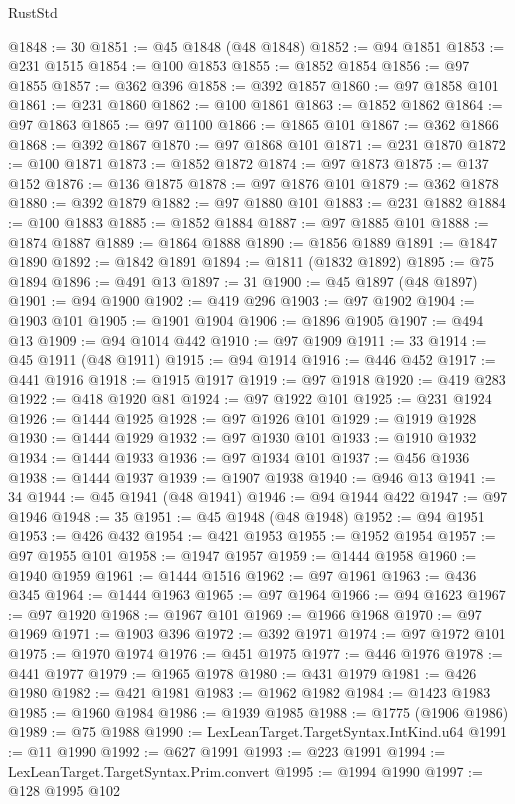 \begin{lexlean}{RustStd}
\begin{coremodule}
@1848 := 30
@1851 := @45 @1848 (@48 @1848)
@1852 := @94 @1851
@1853 := @231 @1515
@1854 := @100 @1853
@1855 := @1852 @1854
@1856 := @97 @1855
@1857 := @362 @396
@1858 := @392 @1857
@1860 := @97 @1858 @101
@1861 := @231 @1860
@1862 := @100 @1861
@1863 := @1852 @1862
@1864 := @97 @1863
@1865 := @97 @1100
@1866 := @1865 @101
@1867 := @362 @1866
@1868 := @392 @1867
@1870 := @97 @1868 @101
@1871 := @231 @1870
@1872 := @100 @1871
@1873 := @1852 @1872
@1874 := @97 @1873
@1875 := @137 @152
@1876 := @136 @1875
@1878 := @97 @1876 @101
@1879 := @362 @1878
@1880 := @392 @1879
@1882 := @97 @1880 @101
@1883 := @231 @1882
@1884 := @100 @1883
@1885 := @1852 @1884
@1887 := @97 @1885 @101
@1888 := @1874 @1887
@1889 := @1864 @1888
@1890 := @1856 @1889
@1891 := @1847 @1890
@1892 := @1842 @1891
@1894 := @1811 (@1832 @1892)
@1895 := @75 @1894
@1896 := @491 @13
@1897 := 31
@1900 := @45 @1897 (@48 @1897)
@1901 := @94 @1900
@1902 := @419 @296
@1903 := @97 @1902
@1904 := @1903 @101
@1905 := @1901 @1904
@1906 := @1896 @1905
@1907 := @494 @13
@1909 := @94 @1014 @442
@1910 := @97 @1909
@1911 := 33
@1914 := @45 @1911 (@48 @1911)
@1915 := @94 @1914
@1916 := @446 @452
@1917 := @441 @1916
@1918 := @1915 @1917
@1919 := @97 @1918
@1920 := @419 @283
@1922 := @418 @1920 @81
@1924 := @97 @1922 @101
@1925 := @231 @1924
@1926 := @1444 @1925
@1928 := @97 @1926 @101
@1929 := @1919 @1928
@1930 := @1444 @1929
@1932 := @97 @1930 @101
@1933 := @1910 @1932
@1934 := @1444 @1933
@1936 := @97 @1934 @101
@1937 := @456 @1936
@1938 := @1444 @1937
@1939 := @1907 @1938
@1940 := @946 @13
@1941 := 34
@1944 := @45 @1941 (@48 @1941)
@1946 := @94 @1944 @422
@1947 := @97 @1946
@1948 := 35
@1951 := @45 @1948 (@48 @1948)
@1952 := @94 @1951
@1953 := @426 @432
@1954 := @421 @1953
@1955 := @1952 @1954
@1957 := @97 @1955 @101
@1958 := @1947 @1957
@1959 := @1444 @1958
@1960 := @1940 @1959
@1961 := @1444 @1516
@1962 := @97 @1961
@1963 := @436 @345
@1964 := @1444 @1963
@1965 := @97 @1964
@1966 := @94 @1623
@1967 := @97 @1920
@1968 := @1967 @101
@1969 := @1966 @1968
@1970 := @97 @1969
@1971 := @1903 @396
@1972 := @392 @1971
@1974 := @97 @1972 @101
@1975 := @1970 @1974
@1976 := @451 @1975
@1977 := @446 @1976
@1978 := @441 @1977
@1979 := @1965 @1978
@1980 := @431 @1979
@1981 := @426 @1980
@1982 := @421 @1981
@1983 := @1962 @1982
@1984 := @1423 @1983
@1985 := @1960 @1984
@1986 := @1939 @1985
@1988 := @1775 (@1906 @1986)
@1989 := @75 @1988
@1990 := LexLeanTarget.TargetSyntax.IntKind.u64
@1991 := @11 @1990
@1992 := @627 @1991
@1993 := @223 @1991
@1994 := LexLeanTarget.TargetSyntax.Prim.convert
@1995 := @1994 @1990
@1997 := @128 @1995 @102

\end{coremodule}
\end{lexlean}
